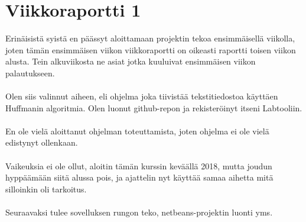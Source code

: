 \documentclass[a4paper]{article}
\begin{document}
\part*{Viikkoraportti 1}

Erinäisistä syistä en päässyt aloittamaan projektin tekoa ensimmäisellä viikolla, joten tämän ensimmäisen viikon viikkoraportti on oikeasti raportti toisen viikon alusta. Tein alkuviikosta ne asiat jotka kuuluivat ensimmäisen viikon palautukseen.
\\
\\
Olen siis valinnut aiheen, eli ohjelma joka tiivistää tekstitiedostoa käyttäen Huffmanin algoritmia. Olen luonut github-repon ja rekisteröinyt itseni Labtooliin.
\\
\\
En ole vielä aloittanut ohjelman toteuttamista, joten ohjelma ei ole vielä edistynyt ollenkaan.
\\
\\
Vaikeuksia ei ole ollut, aloitin tämän kurssin keväällä 2018, mutta joudun hyppäämään siitä alussa pois, ja ajattelin nyt käyttää samaa aihetta mitä silloinkin oli tarkoitus.
\\
\\
Seuraavaksi tulee sovelluksen rungon teko, netbeans-projektin luonti yms.
\end{document}
